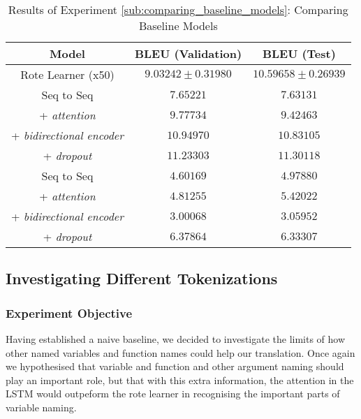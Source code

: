 \begin{table}[!ht]
\begin{center}
\begin{tabular}{ c | c | c }
    Model                             & BLEU (Validation)  & BLEU (Test)    \\
    \hline
    Rote Learner (x50)                & $ 9.03242 \pm  0.31980 $ & $ 10.59658 \pm 0.26939 $   \\
    \hline
    Seq to Seq                        & $ 7.65221 $  & $ 7.63131  $ \\
    + \textit{attention}              & $ 9.77734 $  & $ 9.42463  $ \\
    + \textit{bidirectional encoder}  & $ 10.94970 $ & $ 10.83105 $ \\
    + \textit{dropout}                & $ 11.23303 $ & $ 11.30118 $ \\
    \hline
    Seq to Seq                        & $ 4.60169 $ & $ 4.97880 $  \\
    + \textit{attention}              & $ 4.81255 $ & $ 5.42022 $  \\
    + \textit{bidirectional encoder}  & $ 3.00068 $ & $ 3.05952 $  \\
    + \textit{dropout}                & $ 6.37864 $ & $ 6.33307 $  \\
    \hline
\end{tabular}
\caption {Results of Experiment \ref{sub:comparing_baseline_models}: Comparing Baseline Models }
\label{table:name_baseline}
\end{center}
\end{table}



\subsection{Investigating Different Tokenizations} %
\label{sub:investigating_different_tokenizations}

\subsubsection{Experiment Objective} %

Having established a naive baseline, we decided to investigate the limits of how other named variables and function names could help our translation.
Once again we hypothesised that variable and function and other argument naming should play an important role, but that with this extra information, the attention in the LSTM would outpeform the rote learner in recognising the important parts of variable naming.

